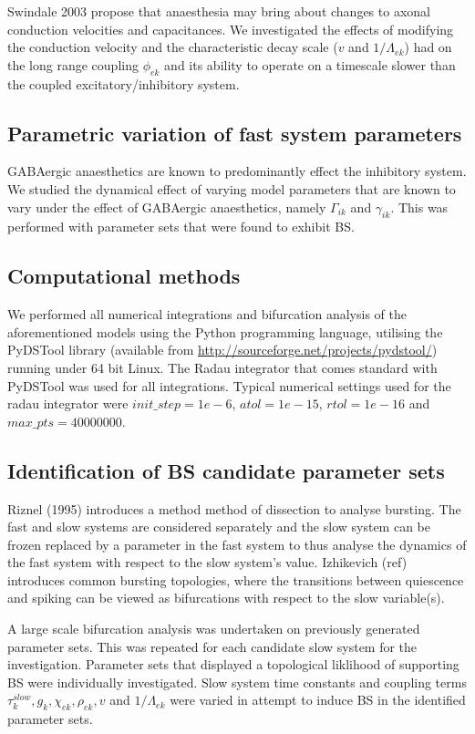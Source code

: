 \documentclass[a4paper,12pt]{article}
\begin{document}
Swindale 2003 propose that anaesthesia may bring about changes to axonal conduction velocities and capacitances. We investigated the
effects of modifying the conduction velocity and the characteristic decay scale ($v$ and $1 / \Lambda_{ek}$) had on the
long range coupling $\phi_{ek}$ and its ability to operate on a timescale slower than the coupled excitatory/inhibitory system.

\subsection{Parametric variation of fast system parameters}
GABAergic anaesthetics are known to predominantly effect the inhibitory system. We studied the dynamical effect of varying model parameters that are known to vary under the effect of GABAergic anaesthetics, namely $\Gamma_{ik}$ and $\gamma_{ik}$. This was performed with parameter sets that were found to exhibit BS.

\subsection{Computational methods}
We performed all numerical integrations and bifurcation analysis of the aforementioned models using the Python programming language, utilising
the PyDSTool library (available from \url{http://sourceforge.net/projects/pydstool/}) running under 64 bit
Linux. The Radau integrator that comes standard with PyDSTool was used for all integrations.
Typical numerical settings used for the radau integrator were $init\_step = 1e-6$, $atol = 1e-15$, $rtol = 1e-16$ and
$max\_pts = 40000000$.

\subsection{Identification of BS candidate parameter sets}
Riznel (1995) introduces a method method of dissection to analyse bursting. The fast and slow systems are considered separately and the slow system can be frozen replaced by a parameter in the fast system to thus analyse the dynamics of the fast system with respect to the slow system's value. Izhikevich (ref) introduces common bursting topologies, where the transitions between quiescence and spiking can be viewed as bifurcations with respect to the slow variable(s).

A large scale bifurcation analysis was undertaken on previously generated parameter sets. This was repeated for each candidate slow system for the investigation. Parameter sets that displayed a topological liklihood of supporting BS were individually investigated. Slow system time constants and coupling terms $\tau_k^{slow}, g_k, \chi_{ek}, \rho_{ek}, v$ and $1 / \Lambda_{ek}$ were varied in attempt to induce BS in the identified parameter sets.
\end{document}
